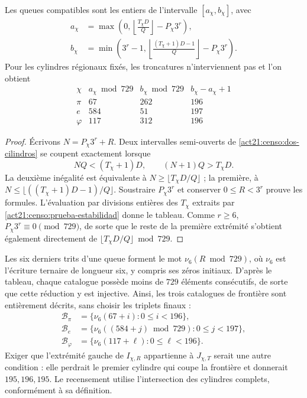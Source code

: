 \begin{proposition}
\label{act21:censo:catalogos}
Les queues compatibles sont les entiers de l'intervalle \([a_\chi,b_\chi]\),
avec
\begin{align}
 a_\chi&=\max\left(0,
       \left\lfloor\frac{T_\chi D}{Q}\right\rfloor-P_\chi3^r\right),
       \label{act21:censo:extremo-a}\\
 b_\chi&=\min\left(3^r-1,
       \left\lfloor\frac{(T_\chi+1)D-1}{Q}\right\rfloor-P_\chi3^r\right).
       \label{act21:censo:extremo-b}
\end{align}
Pour les cylindres régionaux fixés, les troncatures n'interviennent pas et l'on obtient
\begin{equation}
\begin{array}{c|r|r|r}
 \chi&a_\chi\bmod729&b_\chi\bmod729&b_\chi-a_\chi+1\\\hline
 \pi&67&262&196\\
 e&584&51&197\\
 \varphi&117&312&196
\end{array}
\label{act21:censo:tabla-catalogos}
\end{equation}
\end{proposition}
\begin{proof}
Écrivons \(N=P_\chi3^r+R\). Deux intervalles semi-ouverts de
\eqref{act21:censo:dos-cilindros} se coupent exactement lorsque
\[
 NQ<(T_\chi+1)D,\qquad (N+1)Q>T_\chi D.
\]
La deuxième inégalité est équivalente à  
\(N\geq\lfloor T_\chi D/Q\rfloor\) ; la première, à  
\(N\leq\lfloor((T_\chi+1)D-1)/Q\rfloor\). Soustraire  
\(P_\chi3^r\) et conserver \(0\leq R<3^r\) prouve les formules.  
L'évaluation par divisions entières des \(T_\chi\) extraits par  
\eqref{act21:censo:prueba-estabilidad} donne le tableau. Comme \(r\geq6\),  
\(P_\chi3^r\equiv0\pmod{729}\), de sorte que le reste de la première  
extrémité s'obtient également directement de  
\(\lfloor T_\chi D/Q\rfloor\bmod729\).
\end{proof}

Les six derniers trits d'une queue forment le mot
\(\nu_6(R\bmod729)\), où \(\nu_6\) est l'écriture ternaire
de longueur six, y compris ses zéros initiaux. D'après le tableau, chaque
catalogue possède moins de \(729\) éléments consécutifs, de sorte que
cette réduction y est injective. Ainsi, les trois catalogues de frontière
sont entièrement décrits, sans choisir les triplets finaux :
\begin{equation}
 \begin{split}
 \mathcal B_\pi&=\{\nu_6(67+i):0\leq i<196\},\\
 \mathcal B_e&=\{\nu_6((584+j)\bmod729):0\leq j<197\},\\
 \mathcal B_\varphi&=\{\nu_6(117+\ell):0\leq\ell<196\}.
 \end{split}
 \label{act21:censo:fronteras-explicitas}
\end{equation}
Exiger que l'extrémité gauche de \(I_{\chi,R}\) appartienne à
\(J_{\chi,T}\) serait une autre condition : elle perdrait le premier cylindre
qui coupe la frontière et donnerait \(195,196,195\). Le recensement utilise l'intersection des cylindres complets, conformément à sa définition.

